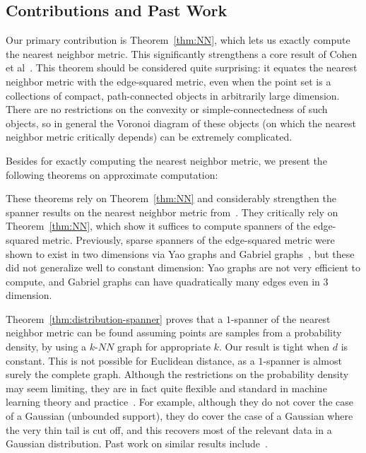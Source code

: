 \subsection{Contributions and Past Work}
Our primary contribution is Theorem~\ref{thm:NN}, which lets us exactly
compute the nearest neighbor metric. This significantly strengthens a core
result of Cohen et al~\cite{cohen15approximating}. This theorem should be considered
quite surprising: it equates the nearest neighbor metric with the
edge-squared metric, even when the point set is a collections of compact,
path-connected objects in arbitrarily large dimension. There are no
restrictions on the convexity or simple-connectedness of such objects, so
in general the Voronoi diagram of these objects (on which the nearest
neighbor metric critically depends) can be extremely complicated.

 Besides for exactly computing the nearest neighbor metric, we present the
following theorems on approximate computation:

 
These theorems rely on Theorem~\ref{thm:NN} and considerably strengthen the
spanner results on the nearest neighbor metric
from~\cite{cohen15approximating}. They critically rely on
Theorem~\ref{thm:NN}, which show it suffices to compute spanners of the
edge-squared metric.
Previously, sparse spanners of the edge-squared metric were shown to exist in two
dimensions via Yao graphs and Gabriel graphs~\cite{LiWan2001}, but these
did not generalize well to constant dimension: Yao
graphs are not very efficient to compute, and Gabriel graphs can have
quadratically many edges even in $3$ dimension.  

Theorem~\ref{thm:distribution-spanner} proves that a $1$-spanner of
the nearest neighbor metric can be found assuming points are samples from a
probability density, by using a $k$-$NN$ graph for
appropriate $k$. Our result is tight when $d$ is constant. This
is not possible for Euclidean distance, as a $1$-spanner is almost
surely the complete graph. Although the restrictions on the probability
density may seem limiting,
they are in fact quite flexible and standard in
machine learning theory and practice~\cite{hwang2016, alamgir12shortest}. For example, although they do not cover the case
of a Gaussian (unbounded support), they do cover the case of a Gaussian
where the very thin tail is cut off, and this recovers most of the relevant
data in a Gaussian distribution. Past work on similar results
include~\cite{Balister05, Gonzales2003}.

